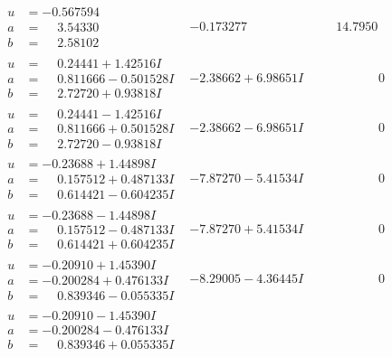 \documentclass[1p]{elsarticle_modified}
\theoremstyle{definition}
\begin{document}
$$\begin{array}{c|c|c}
\begin{aligned}
u &= -0.567594\phantom{ +0.000000I} \\
a &= \phantom{-}3.54330\phantom{ +0.000000I} \\
b &= \phantom{-}2.58102\phantom{ +0.000000I}\end{aligned}
 & -0.173277\phantom{ +0.000000I} & \phantom{-}14.7950\phantom{ +0.000000I} \\ \hline\begin{aligned}
u &= \phantom{-}0.24441 + 1.42516 I \\
a &= \phantom{-}0.811666 - 0.501528 I \\
b &= \phantom{-}2.72720 + 0.93818 I\end{aligned}
 & -2.38662 + 6.98651 I & \phantom{-0.000000 } 0 \\ \hline\begin{aligned}
u &= \phantom{-}0.24441 - 1.42516 I \\
a &= \phantom{-}0.811666 + 0.501528 I \\
b &= \phantom{-}2.72720 - 0.93818 I\end{aligned}
 & -2.38662 - 6.98651 I & \phantom{-0.000000 } 0 \\ \hline\begin{aligned}
u &= -0.23688 + 1.44898 I \\
a &= \phantom{-}0.157512 + 0.487133 I \\
b &= \phantom{-}0.614421 - 0.604235 I\end{aligned}
 & -7.87270 - 5.41534 I & \phantom{-0.000000 } 0 \\ \hline\begin{aligned}
u &= -0.23688 - 1.44898 I \\
a &= \phantom{-}0.157512 - 0.487133 I \\
b &= \phantom{-}0.614421 + 0.604235 I\end{aligned}
 & -7.87270 + 5.41534 I & \phantom{-0.000000 } 0 \\ \hline\begin{aligned}
u &= -0.20910 + 1.45390 I \\
a &= -0.200284 + 0.476133 I \\
b &= \phantom{-}0.839346 - 0.055335 I\end{aligned}
 & -8.29005 - 4.36445 I & \phantom{-0.000000 } 0 \\ \hline\begin{aligned}
u &= -0.20910 - 1.45390 I \\
a &= -0.200284 - 0.476133 I \\
b &= \phantom{-}0.839346 + 0.055335 I\end{aligned}

\end{array}$$
\end{document}
